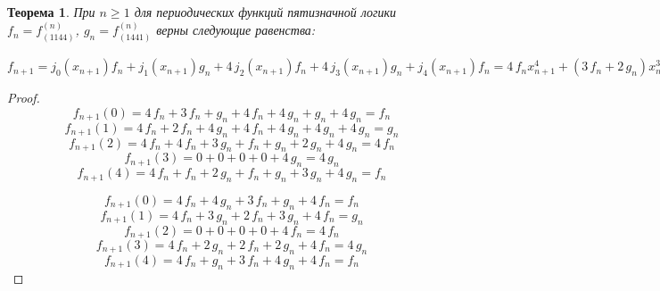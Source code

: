 \documentclass[a4paper, 14pt]{extarticle}
\newtheorem{myth}{Теорема}
\begin{document}
\begin{myth} При $n \geqslant 1 $ для периодических функций пятизначной логики $f_n = f^{\left(n\right)}_{\left(1144\right)}$,
$g_n = f^{\left(n\right)}_{\left(1441\right)}$ верны следующие равенства:
\end{myth}$ f_{n+1} = j_0(x_{n+1})f_n + j_1(x_{n+1})g_n + 4\,j_2(x_{n+1})f_n + 4\,j_3(x_{n+1})g_n + j_4(x_{n+1})f_n = 4 \, f_{n} x_{n+1}^{4} + {\left(3 \, f_{n} + 2 \, g_{n}\right)} x_{n+1}^{3} + 3 \, {\left(f_{n} + g_{n}\right)} x_{n+1}^{2} + {\left(4 \, f_{n} + g_{n}\right)} x_{n+1} + f_{n}
 = 4 \, f_{n} {\left(x_{n+1} + 1\right)}^{4} + 2 \, {\left(f_{n} + g_{n}\right)} {\left(x_{n+1} + 1\right)}^{3} + {\left(3 \, f_{n} + 2 \, g_{n}\right)} {\left(x_{n+1} + 1\right)}^{2} + {\left(f_{n} + g_{n}\right)} {\left(x_{n+1} + 1\right)} + f_{n}
 = 4 \, f_{n} {\left(x_{n+1} + 2\right)}^{4} + {\left(f_{n} + 2 \, g_{n}\right)} {\left(x_{n+1} + 2\right)}^{3} + {\left(f_{n} + g_{n}\right)} {\left(x_{n+1} + 2\right)}^{2} + 3 \, g_{n} {\left(x_{n+1} + 2\right)} + 4 \, g_{n}
 = 4 \, f_{n} {\left(x_{n+1} + 3\right)}^{4} + 2 \, g_{n} {\left(x_{n+1} + 3\right)}^{3} + 2 \, f_{n} {\left(x_{n+1} + 3\right)}^{2} + 2 \, g_{n} {\left(x_{n+1} + 3\right)} + 4 \, f_{n}
 = 4 \, f_{n} {\left(x_{n+1} + 4\right)}^{4} + 2 \, {\left(2 \, f_{n} + g_{n}\right)} {\left(x_{n+1} + 4\right)}^{3} + {\left(f_{n} + 4 \, g_{n}\right)} {\left(x_{n+1} + 4\right)}^{2} + 3 \, g_{n} {\left(x_{n+1} + 4\right)} + g_{n}
$
\begin{proof}
$$f_{n+1}(0) = 4\,f_n + 3\,f_n + g_n + 4\,f_n + 4\,g_n + g_n + 4\,g_n = f_n$$
$$f_{n+1}(1) = 4\,f_n + 2\,f_n + 4\,g_n + 4\,f_n + 4\,g_n + 4\,g_n + 4\,g_n = g_n$$
$$f_{n+1}(2) = 4\,f_n + 4\,f_n + 3\,g_n + f_n + g_n + 2\,g_n + 4\,g_n = 4\,f_n$$
$$f_{n+1}(3) = 0 + 0 + 0 + 0 + 4\,g_n = 4\,g_n$$
$$f_{n+1}(4) = 4\,f_n + f_n + 2\,g_n + f_n + g_n + 3\,g_n + 4\,g_n = f_n$$

$$f_{n+1}(0) = 4\,f_n + 4\,g_n + 3\,f_n + g_n + 4\,f_n = f_n$$
$$f_{n+1}(1) = 4\,f_n + 3\,g_n + 2\,f_n + 3\,g_n + 4\,f_n = g_n$$
$$f_{n+1}(2) = 0 + 0 + 0 + 0 + 4\,f_n = 4\,f_n$$
$$f_{n+1}(3) = 4\,f_n + 2\,g_n + 2\,f_n + 2\,g_n + 4\,f_n = 4\,g_n$$
$$f_{n+1}(4) = 4\,f_n + g_n + 3\,f_n + 4\,g_n + 4\,f_n = f_n$$


\end{proof}
\end{document}
